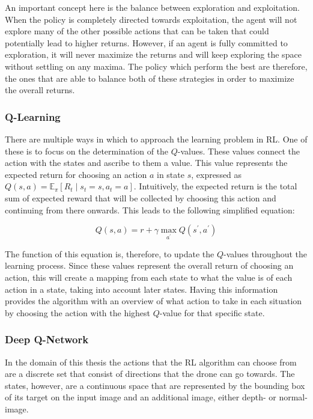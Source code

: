 An important concept here is the balance between exploration and exploitation. 
When the policy is completely directed towards exploitation, the agent will 
not explore many of the other possible actions that can be taken that could 
potentially lead to higher returns. However, if an agent is fully committed to 
exploration, it will never maximize the returns and will keep exploring the space 
without settling on any maxima. The policy which perform the best are therefore, 
the ones that are able to balance both of these strategies in order to maximize 
the overall returns. 

\subsubsection{Q-Learning}
There are multiple ways in which to approach the learning problem in RL. 
One of these is to focus on the determination of the $Q$-values. These values
connect the action with the states and ascribe to them a value. This value
represents the expected return for choosing an action $a$ in state $s$, 
expressed as $Q(s, a)=\mathbb{E}_{\pi}\left[R_{t} \mid s_{t}=s, a_{t}=a\right]$.
Intuitively, the expected return is the total sum of expected reward that will be 
collected by choosing this action and continuing from there onwards. This leads to 
the following simplified equation:

\begin{equation}
    Q(s, a)=r+\gamma \max_{a^{\prime}} Q\left(s^{\prime}, a^{\prime}\right)
\end{equation}

The function of this equation is, therefore, to update the $Q$-values throughout
the learning process. Since these values represent the overall return of choosing
an action, this will create a mapping from each state to what the value is of each action in a state,
taking into account later states. Having this information provides the algorithm 
with an overview of what action to take in each situation by choosing the action with the 
highest $Q$-value for that specific state. 

\subsubsection{Deep Q-Network}
In the domain of this thesis the actions 
that the RL algorithm can choose from are a discrete set that consist of directions 
that the drone can go towards. The states, however, are a continuous space that are 
represented by the bounding box of its target on the input image and an additional image, 
either depth- or normal-image. 

